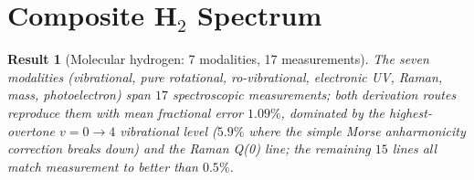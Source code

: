 \documentclass[twocolumn,11pt,a4paper]{article}
\theoremstyle{stmtstyle}
\newtheorem{result}{Result}
\theoremstyle{definition}
\theoremstyle{remark}
\begin{document}
\section{Composite H$_{2}$ Spectrum}
\label{sec:h2composite}

\begin{result}[Molecular hydrogen: 7 modalities, 17 measurements]\label{res:h2comp}
The seven modalities (vibrational, pure rotational, ro-vibrational, electronic UV, Raman, mass, photoelectron) span $17$ spectroscopic measurements; both derivation routes reproduce them with mean fractional error $1.09\%$, dominated by the highest-overtone $v=0\to 4$ vibrational level ($5.9\%$ where the simple Morse anharmonicity correction breaks down) and the Raman Q(0) line; the remaining $15$ lines all match measurement to better than $0.5\%$.
\end{result}
\end{document}

